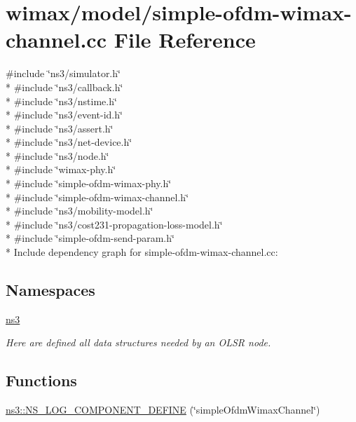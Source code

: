 \hypertarget{simple-ofdm-wimax-channel_8cc}{}\section{wimax/model/simple-\/ofdm-\/wimax-\/channel.cc File Reference}
\label{simple-ofdm-wimax-channel_8cc}
{\ttfamily \#include \char`\"{}ns3/simulator.\+h\char`\"{}}\\*
{\ttfamily \#include \char`\"{}ns3/callback.\+h\char`\"{}}\\*
{\ttfamily \#include \char`\"{}ns3/nstime.\+h\char`\"{}}\\*
{\ttfamily \#include \char`\"{}ns3/event-\/id.\+h\char`\"{}}\\*
{\ttfamily \#include \char`\"{}ns3/assert.\+h\char`\"{}}\\*
{\ttfamily \#include \char`\"{}ns3/net-\/device.\+h\char`\"{}}\\*
{\ttfamily \#include \char`\"{}ns3/node.\+h\char`\"{}}\\*
{\ttfamily \#include \char`\"{}wimax-\/phy.\+h\char`\"{}}\\*
{\ttfamily \#include \char`\"{}simple-\/ofdm-\/wimax-\/phy.\+h\char`\"{}}\\*
{\ttfamily \#include \char`\"{}simple-\/ofdm-\/wimax-\/channel.\+h\char`\"{}}\\*
{\ttfamily \#include \char`\"{}ns3/mobility-\/model.\+h\char`\"{}}\\*
{\ttfamily \#include \char`\"{}ns3/cost231-\/propagation-\/loss-\/model.\+h\char`\"{}}\\*
{\ttfamily \#include \char`\"{}simple-\/ofdm-\/send-\/param.\+h\char`\"{}}\\*
Include dependency graph for simple-\/ofdm-\/wimax-\/channel.cc\+:
\subsection*{Namespaces}
\begin{DoxyCompactItemize}
\item 
 \hyperlink{namespacens3}{ns3}
\begin{DoxyCompactList}\small\item\em Here are defined all data structures needed by an O\+L\+SR node. \end{DoxyCompactList}\end{DoxyCompactItemize}
\subsection*{Functions}
\begin{DoxyCompactItemize}
\item 
\hyperlink{namespacens3_a4d1d6c5c90c7d9b235d18cc700db2e73}{ns3\+::\+N\+S\+\_\+\+L\+O\+G\+\_\+\+C\+O\+M\+P\+O\+N\+E\+N\+T\+\_\+\+D\+E\+F\+I\+NE} (\char`\"{}simple\+Ofdm\+Wimax\+Channel\char`\"{})
\end{DoxyCompactItemize}
